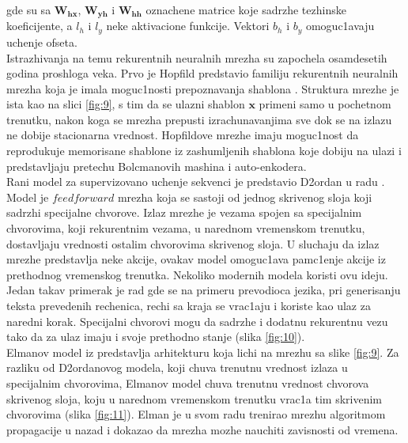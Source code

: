 \documentclass[a4paper, openany, oneside, 11pt]{book}
\begin{document}
gde su sa $\mathbf{W_{hx}}$, $\mathbf{W_{yh}}$ i $\mathbf{W_{hh}}$ oznachene matrice koje sadrzhe tezhinske koeficijente, a $l_h$ i $l_y$ neke aktivacione funkcije. Vektori $b_h$ i $b_y$ omoguc1avaju uchenje ofseta.\\
Istrazhivanja na temu rekurentnih neuralnih mrezha su zapochela osamdesetih godina proshloga veka. Prvo je Hopfild predstavio familiju rekurentnih neuralnih mrezha koja je imala moguc1nosti prepoznavanja shablona \cite{Hopfild}. Struktura mrezhe je ista kao na slici \ref{fig:9}, s tim da se ulazni shablon $\mathbf{x}$ primeni samo u pochetnom trenutku, nakon koga se mrezha prepusti izrachunavanjima  sve dok se na izlazu ne dobije stacionarna vrednost. Hopfildove mrezhe imaju moguc1nost da reprodukuje memorisane shablone iz zashumljenih shablona koje dobiju na ulazi i predstavljaju pretechu Bolcmanovih mashina i auto-enkodera.\\
Rani model za supervizovano uchenje sekvenci je predstavio D2ordan u radu \cite{jordan}. Model je $feedforward$ mrezha koja se sastoji od jednog skrivenog sloja koji sadrzhi specijalne chvorove. Izlaz mrezhe je vezama spojen sa specijalnim chvorovima, koji rekurentnim vezama, u narednom vremenskom trenutku, dostavljaju vrednosti ostalim chvorovima skrivenog sloja. U sluchaju da izlaz mrezhe predstavlja neke akcije, ovakav model omoguc1ava pamc1enje akcije iz prethodnog vremenskog trenutka. Nekoliko modernih modela koristi ovu ideju. Jedan takav primerak je rad \cite{Sutskever} gde se na primeru prevodioca jezika, pri generisanju teksta prevedenih rechenica, rechi sa kraja se vrac1aju i koriste kao ulaz za naredni korak. Specijalni chvorovi mogu da sadrzhe i dodatnu rekurentnu vezu tako da za ulaz imaju i svoje prethodno stanje (slika \ref{fig:10}).\\
Elmanov model iz \cite{Elman} predstavlja arhitekturu koja lichi na mrezhu sa slike \ref{fig:9}. Za razliku od D2ordanovog modela, koji chuva trenutnu vrednost izlaza u specijalnim chvorovima, Elmanov model chuva trenutnu vrednost chvorova skrivenog sloja, koju u narednom vremenskom trenutku vrac1a tim skrivenim chvorovima (slika \ref{fig:11}). Elman je u svom radu trenirao mrezhu algoritmom propagacije u nazad i dokazao da mrezha mozhe nauchiti zavisnosti od vremena.
\newpage
\end{document}
